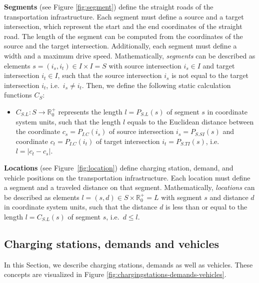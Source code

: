 \documentclass[graybox]{svmult}
\begin{document}
\noindent \textbf{Segments} (see Figure \ref{fig:segment}) define the straight roads of the transportation infrastructure.
Each segment must define a source and a target intersection, which represent the start and the end coordinates of the straight road.
The length of the segment can be computed from the coordinates of the source and the target intersection.
Additionally, each segment must define a width and a maximum drive speed.
Mathematically, \textit{segments} can be described as elements $s = (i_s, i_t) \in I \times I = S$ with source intersection $i_s \in I$ and target intersection $i_t \in I$, such that the source intersection $i_s$ is not equal to the target intersection $i_t$, i.e.\ $i_s \neq i_t$.
Then, we define the following static calculation functions $C_{S}$:
\begin{itemize}
	\item $C_{S.L}: S \rightarrow \mathbb{R}_0^+$ represents the length $l = P_{S.L}(s)$ of segment $s$ in coordinate system units, such that the length $l$ equals to the Euclidean distance between the coordinate $c_s = P_{I.C}(i_s)$ of source intersection $i_s = P_{S.SI}(s)$ and coordinate $c_t = P_{I.C}(i_t)$ of target intersection $i_t = P_{S.TI}(s)$, i.e.\ $l = |c_t - c_s|$.
\end{itemize}

\noindent \textbf{Locations} (see Figure~\ref{fig:location}) define charging station, demand, and vehicle positions on the transportation infrastructure.
Each location must define a segment and a traveled distance on that segment.
Mathematically, \textit{locations} can be described as elements $l = (s, d) \in S \times \mathbb{R}_0^+ = L$ with segment $s$ and distance $d$ in coordinate system units, such that the distance $d$ is less than or equal to the length $l = C_{S.L}(s)$ of segment $s$, i.e.\ $d \leq l$.

\subsection{Charging stations, demands and vehicles}
\label{sec:chargingstations-demands-vehicles}

In this Section, we describe charging stations, demands as well as vehicles. These concepts are visualized in Figure \ref{fig:chargingstations-demands-vehicles}.
\end{document}
